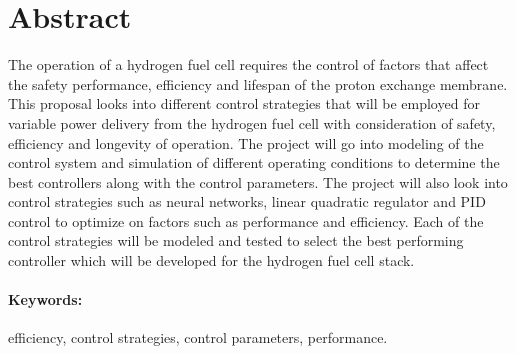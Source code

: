 
\section*{Abstract}
\label{sec:Abstract}
The operation of a hydrogen fuel cell requires the control of factors that affect the safety performance, efficiency and lifespan of the proton exchange membrane. This proposal  looks into different control strategies that will be employed for variable power delivery from the hydrogen fuel cell with consideration of safety, efficiency and longevity of operation.
The project will go into modeling of the control system and simulation of different operating conditions to determine the best controllers along with the control parameters. The project will also look into control strategies such as neural networks, linear quadratic regulator and PID control to optimize on factors such as performance and efficiency. Each of the control strategies will be modeled and tested to select the best performing controller which will be developed for the hydrogen fuel cell stack.

\paragraph{\textbf{Keywords:}} efficiency, control strategies, control parameters, performance.




